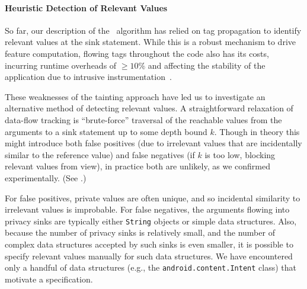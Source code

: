 \paragraph{Heuristic Detection of Relevant Values} So far, our description of the \Tool\ algorithm has relied on tag propagation to identify relevant values at the sink statement. While this is a robust mechanism to drive feature computation, flowing tags throughout the code also has its costs, incurring runtime overheads of $\geq 10\%$ and affecting the stability of the application due to intrusive instrumentation~\cite{EGCCJMS:OSDI10}.

These weaknesses of the tainting approach have led us to investigate an alternative method of detecting relevant values. A straightforward relaxation of data-flow tracking is ``brute-force'' traversal of the reachable values from the arguments to a sink statement up to some depth bound $k$. Though in theory this might introduce both false positives (due to irrelevant values that are incidentally similar to the reference value) and false negatives (if $k$ is too low, blocking relevant values from view), in practice both are unlikely, as we confirmed experimentally. (See .) 

For false positives, private values are often unique, and so incidental similarity to irrelevant values is improbable. For false negatives, the arguments flowing into privacy sinks are typically either {\tt String} objects or simple data structures. Also, because the number of privacy sinks is relatively small, and the number of complex data structures accepted by such sinks is even smaller, it is possible to specify relevant values manually for such data structures. We have encountered only a handful of data structures (e.g., the \texttt{android.content.Intent} class) that motivate a specification. 




